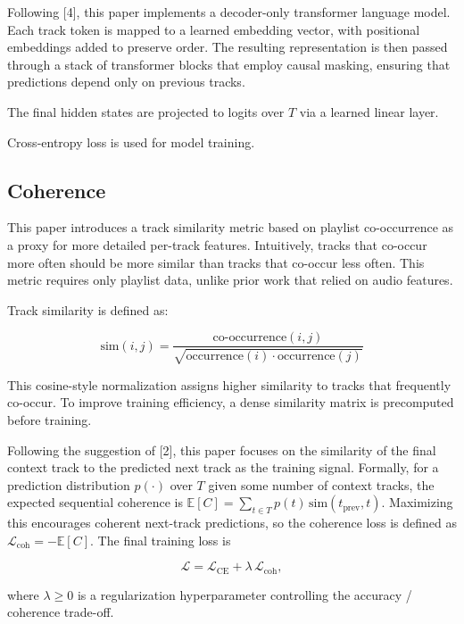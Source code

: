 \documentclass[conference]{IEEEtran}
\begin{document}
Following [4], this paper implements a decoder-only transformer language model. Each track token is mapped to a learned 
embedding vector, with positional embeddings added to preserve order. The resulting representation is then passed through a 
stack of transformer blocks that employ causal masking, ensuring that predictions depend only on previous tracks.

The final hidden states are projected to logits over $T$ via a learned linear layer.

Cross-entropy loss is used for model training.

\subsection{Coherence}

This paper introduces a track similarity metric based on playlist co-occurrence as a proxy for more detailed per-track features. 
Intuitively, tracks that co-occur more often should be more similar than tracks that co-occur less often. 
This metric requires only playlist data, unlike prior work that relied on audio features.

Track similarity is defined as:

\begin{equation}
\text{sim}(i, j) = \frac{\text{co-occurrence}(i, j)}{\sqrt{\text{occurrence}(i)\cdot\text{occurrence}(j)}}
\end{equation}

This cosine-style normalization assigns higher similarity to tracks that frequently co-occur. To improve training efficiency, a dense similarity 
matrix is precomputed before training.

Following the suggestion of [2], this paper focuses on the similarity of the final context track to the predicted next track as the training signal. 
Formally, for a prediction distribution $p(\cdot)$ over $T$ given some number of context tracks, the expected sequential 
coherence is $\mathbb{E}[C] = \sum_{t \in T} p(t)\,\text{sim}(t_\text{prev}, t)$. 
Maximizing this encourages coherent next-track predictions, so the coherence loss is defined as $\mathcal{L}_\text{coh} = -\mathbb{E}[C]$. 
The final training loss is

\begin{equation}
\mathcal{L} = \mathcal{L}_\text{CE} + \lambda\,\mathcal{L}_\text{coh},
\end{equation}

\noindent where $\lambda \geq 0$ is a regularization hyperparameter controlling the accuracy / coherence trade-off.
\end{document}
